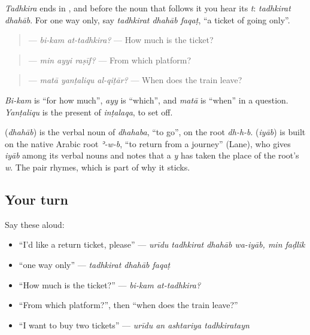 \emph{Tadhkira} ends in \textbf{}, and before the noun that follows it you hear its \emph{t}: \emph{tadhkirat dhahāb}. For one way only, say \emph{tadhkirat dhahāb faqaṭ}, \textquotedblleft{}a ticket of going only\textquotedblright{}.

\begin{grammarlens}[title={Grammar Lens: three questions at the counter}]
\begin{quote}
\textbf{ } — \emph{bi-kam at-tadhkira?} — How much is the ticket?
\end{quote}

\begin{quote}
\textbf{  } — \emph{min ayyi raṣīf?} — From which platform?
\end{quote}

\begin{quote}
\textbf{  } — \emph{matā yanṭaliqu al-qiṭār?} — When does the train leave?
\end{quote}

\emph{Bi-kam} is \textquotedblleft{}for how much\textquotedblright{}, \emph{ayy} is \textquotedblleft{}which\textquotedblright{}, and \emph{matā} is \textquotedblleft{}when\textquotedblright{} in a question. \emph{Yanṭaliqu} is the present of \emph{inṭalaqa}, to set off.
\end{grammarlens}

\begin{cousinweb}
\textbf{} (\emph{dhahāb}) is the verbal noun of \emph{dhahaba}, \textquotedblleft{}to go\textquotedblright{}, on the root \emph{dh-h-b}. \textbf{} (\emph{iyāb}) is built on the native Arabic root \emph{ʾ-w-b}, \textquotedblleft{}to return from a journey\textquotedblright{} (Lane), who gives \emph{iyāb} among its verbal nouns and notes that a \emph{y} has taken the place of the root's \emph{w}. The pair rhymes, which is part of why it sticks.
\end{cousinweb}

\subsection*{Your turn}
Say these aloud:

\begin{itemize}
\raggedright
  \item \textquotedblleft{}I'd like a return ticket, please\textquotedblright{} — \emph{urīdu tadhkirat dhahāb wa-iyāb, min faḍlik}
  \item \textquotedblleft{}one way only\textquotedblright{} — \emph{tadhkirat dhahāb faqaṭ}
  \item \textquotedblleft{}How much is the ticket?\textquotedblright{} — \emph{bi-kam at-tadhkira?}
  \item \textquotedblleft{}From which platform?\textquotedblright{}, then \textquotedblleft{}when does the train leave?\textquotedblright{}
  \item \textquotedblleft{}I want to buy two tickets\textquotedblright{} — \emph{urīdu an ashtariya tadhkiratayn}
\end{itemize}

